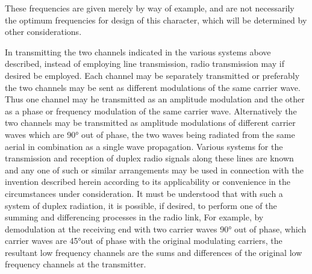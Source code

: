 \documentclass[11pt]{article}
\begin{document}
\begin{multicols*}{2}
These frequencies are given merely by way of example, and are not necessarily the optimum frequencies for design of this character, which will be determined by other considerations. 

In transmitting the two channels indicated in the various systems above described, instead of employing line transmission, radio transmission may if desired be employed. Each channel may be separately transmitted or preferably the two channels may be sent as different modulations of the same carrier wave. Thus one channel may he transmitted as an amplitude modulation and the other as a phase or frequency modulation of the same carrier wave. Alternatively the two channels may be transmitted as amplitude modulations of different carrier waves which are 90° out of phase, the two waves being radiated from the same aerial in combination as a single wave propagation. Various systems for the transmission and reception of duplex radio signals along these lines are known and any one of such or similar arrangements may be used in connection with the invention described herein according to its applicability or convenience in the circumstances under consideration. It must be understood that with such a system of duplex radiation, it is possible, if desired, to perform one of the summing and differencing processes in the radio link, For example, by demodulation at the receiving end with two carrier waves 90° out of phase, which carrier waves are 45°out of phase with the original modulating carriers, the resultant low frequency channels are the sums and differences of the original low frequency channels at the transmitter.
 

\end{multicols*}
\end{document}
